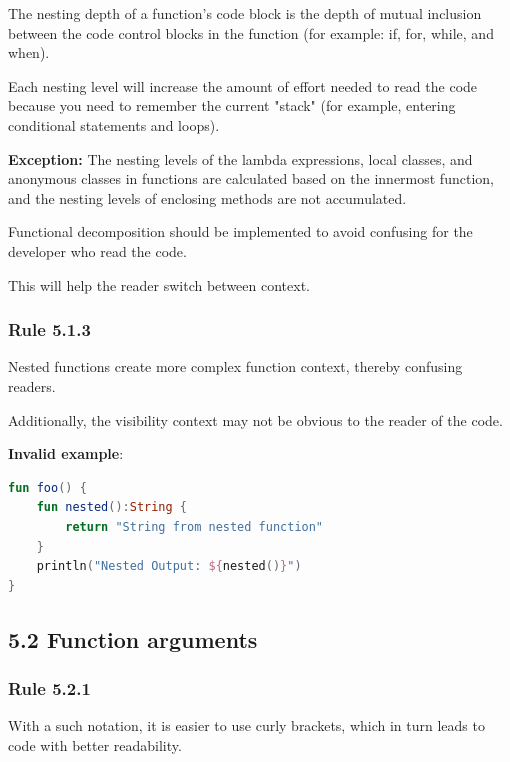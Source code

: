 {{{{The nesting depth of a function's code block is the depth of mutual inclusion between the code control blocks in the function (for example: if, for, while, and when).

Each nesting level will increase the amount of effort needed to read the code because you need to remember the current "stack" (for example, entering conditional statements and loops).

\textbf{Exception:} The nesting levels of the lambda expressions, local classes, and anonymous classes in functions are calculated based on the innermost function, and the nesting levels of enclosing methods are not accumulated.

Functional decomposition should be implemented to avoid confusing for the developer who read the code.

This will help the reader switch between context.



\subsubsection*{\textbf{Rule 5.1.3}}
\leavevmode\newline

Nested functions create more complex function context, thereby confusing readers.

Additionally, the visibility context may not be obvious to the reader of the code.



\textbf{Invalid example}:

\begin{lstlisting}[language=Kotlin]
fun foo() {
    fun nested():String {
        return "String from nested function"
    }
    println("Nested Output: ${nested()}")
}
\end{lstlisting}


\subsection*{\textbf{5.2 Function arguments}}

\subsubsection*{\textbf{Rule 5.2.1}}
\leavevmode\newline



With a such notation, it is easier to use curly brackets, which in turn leads to code with better readability.



}}}}
